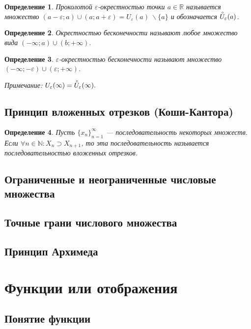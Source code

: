 \documentclass[a4paper,12pt]{article} %
\newtheorem{definition}{Определение}[section]
\theoremstyle{remark}
\theoremstyle{definition}
\begin{document}
\begin{definition}
	Проколотой $\varepsilon$-окрестностью точки $a\in \mathbb{R}$ называется множество $(a-\varepsilon;a)\cup (a; a+\varepsilon) = U_\varepsilon(a)\ \backslash \{a\}$ и обозначается $\accentset{\circ}{U}_\varepsilon(a)$.
\end{definition}

\begin{definition}
	Окрестностью бесконечности называют любое множество вида $(-\infty; a)\cup (b; +\infty).$
\end{definition}
\begin{definition}
	$\varepsilon$-окрестностью бесконечности называют множество $(-\infty; -\varepsilon)\cup (\varepsilon; +\infty)$.

	Примечание: $U_\varepsilon(\infty)=\accentset{\circ}{U}_\varepsilon(\infty).$
\end{definition}

\subsection{Принцип вложенных отрезков (Коши-Кантора)}
\begin{definition}
	Пусть $\{x_n\}_{n=1}^{\infty}$ --- последовательность некоторых множеств. Если $\forall n\in \mathbb{N}:X_n\supset X_{n+1}$, то эта последовательность называется последовательностью вложенных отрезков.
\end{definition}

\subsection{Ограниченные и неограниченные числовые множества}
\subsection{Точные грани числового множества}
\subsection{Принцип Архимеда}


\newpage
\section{Функции или отображения}
\subsection{Понятие функции}
\end{document}
